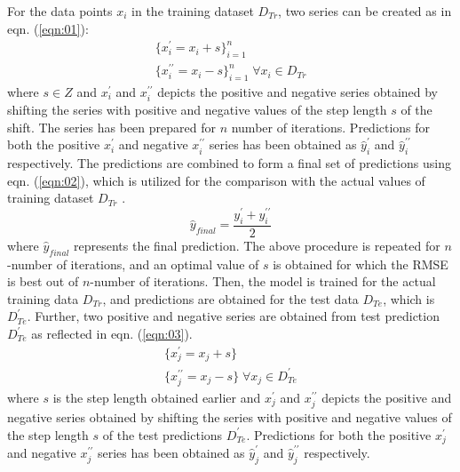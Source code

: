 \documentclass[sn-mathphys,Numbered]{sn-jnl}
\theoremstyle{thmstyleone}
\theoremstyle{thmstyletwo}
\theoremstyle{thmstylethree}
\begin{document}
For the data points $x_i$ in the training dataset $D_{Tr}$, two series can be created as in eqn. (\ref{eqn:01}):
\begin{equation}
\begin{aligned}
\label{eqn:01}
\{x_i^{\prime}=x_i+s\}_{i=1}^n \\
\{x_i^{\prime\prime}=x_i-s\}_{i=1}^n \; \forall x_i \in D_{Tr}
\end{aligned}
\end{equation}
where $s \in Z$ and $x_i^{\prime}$ and $x_{i}^{\prime\prime}$ depicts the positive and negative series obtained by shifting the series with positive and negative values of the step length $s$ of the shift. The series has been prepared for $n$ number of iterations.
Predictions for both the positive $x_i^{\prime}$ and negative $x_i^{\prime\prime}$ series has been obtained as $\hat{y}_i^{\prime}$ and $ \hat{y}_i^{\prime\prime}$ respectively.
The predictions are combined to form a final set of predictions using eqn. (\ref{eqn:02}), which is utilized for the comparison with the actual values of training dataset $D_{Tr}$ .
\begin{equation}
\label{eqn:02}
\hat{y}_{final}=\frac{y_i^{\prime}+y_i^{\prime\prime}}{2}
\end{equation}
where $\hat{y}_{final}$ represents the final prediction. The above procedure is repeated for $n$-number of iterations, and an optimal value of $s$ is obtained for which the RMSE is best out of $n$-number of iterations.
Then, the model is trained for the actual training data $D_{Tr}$, and predictions are obtained for the test data $D_{Te}$, which is $D_{Te}^{\prime}$. Further, two positive and negative series are obtained from test prediction $D_{Te}^{\prime}$ as reflected in eqn. (\ref{eqn:03}).
\begin{equation}
\begin{aligned}
\label{eqn:03}
\{x_j^{\prime}=x_j+s\} \\
\{x_j^{\prime\prime}=x_j-s\} \; \forall x_j \in D_{Te}^{\prime}
\end{aligned}
\end{equation}
where $s$ is the step length obtained earlier and $x_j^{\prime}$ and $x_{j}^{\prime\prime}$ depicts the positive and negative series obtained by shifting the series with positive and negative values of the step length $s$ of the test predictions $ D_{Te}^{\prime}$.
Predictions for both the positive $x_j^{\prime}$ and negative $x_j^{\prime\prime}$ series has been obtained as $ \hat{y}_j^{\prime}$ and $ \hat{y}_j^{\prime\prime}$ respectively.
\end{document}
